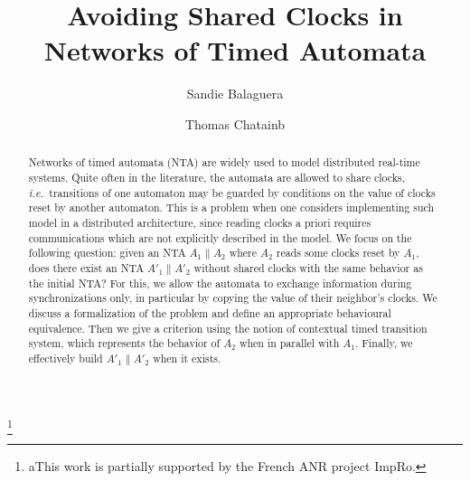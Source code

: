 \documentclass{LMCS}
\theoremstyle{plain}\newtheorem*{prop11}{Proposition~\ref{prop:states} bis}
\def\ie{{\em i.e.\ }}
\begin{document}
\title[Avoiding Shared Clocks in NTA]
{Avoiding Shared Clocks in Networks of Timed Automata\rsuper*}

\author[S.~Balaguer]{Sandie Balaguer\rsuper a}	\address{LSV (ENS Cachan, CNRS, Inria)\\
61, avenue du Pr\'esident Wilson\\
94235 CACHAN Cedex, France}	  \thanks{{\lsuper a}This work is partially supported by the French ANR project ImpRo.}

\author[T.~Chatain]{Thomas Chatain\rsuper b}	







\begin{abstract}
  \noindent Networks of timed automata (NTA) are widely used to model distributed real-time
  systems. Quite often in the literature, the automata are allowed to share
  clocks, \ie transitions of one automaton may be guarded by conditions
  on the value of clocks reset by another automaton. This is a
  problem when one considers implementing such model in a distributed
  architecture, since reading clocks a priori requires communications which are
  not explicitly described in the model. We focus on the following question: given
  an NTA $A_1\parallel A_2$ where $A_2$ reads some clocks reset by $A_1$,
  does there exist an NTA $A'_1\parallel A'_2$ without shared clocks
  with the same behavior as the initial NTA?
For this, we allow the automata to exchange information during synchronizations
  only, in particular by copying the value of their neighbor's clocks.
We discuss a formalization of the problem and define an appropriate
  behavioural equivalence. Then we give a criterion using the notion
  of contextual timed transition system, which represents the behavior of $A_2$
  when in parallel with $A_1$.
  Finally, we effectively build $A'_1\parallel A'_2$ when it exists.
\end{abstract}

\maketitle
\end{document}
